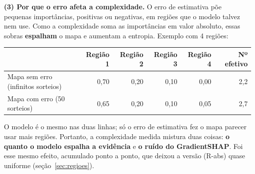 \documentclass[11pt,a4paper]{article}
\begin{document}
\textbf{(3) Por que o erro afeta a complexidade.} O erro de estimativa põe pequenas importâncias, positivas ou negativas, em regiões que o modelo talvez nem use. Como a complexidade soma as importâncias em valor absoluto, essas sobras \textbf{espalham} o mapa e aumentam a entropia. Exemplo com 4 regiões:
\begin{center}\small
\begin{tabular}{lrrrrr}
\toprule
& \textbf{Região 1} & \textbf{Região 2} & \textbf{Região 3} & \textbf{Região 4} & \textbf{Nº efetivo} \\
\midrule
Mapa sem erro (infinitos sorteios) & 0,70 & 0,20 & 0,10 & 0,00 & 2,2 \\
Mapa com erro (50 sorteios) & 0,65 & 0,20 & 0,10 & 0,05 & 2,7 \\
\bottomrule
\end{tabular}
\end{center}
O modelo é o mesmo nas duas linhas; só o erro de estimativa fez o mapa parecer usar mais regiões. Portanto, a complexidade medida mistura duas coisas: \textbf{o quanto o modelo espalha a evidência} e \textbf{o ruído do GradientSHAP}. Foi esse mesmo efeito, acumulado ponto a ponto, que deixou a versão (R-abs) quase uniforme (seção~\ref{sec:regioes}).
\end{document}
